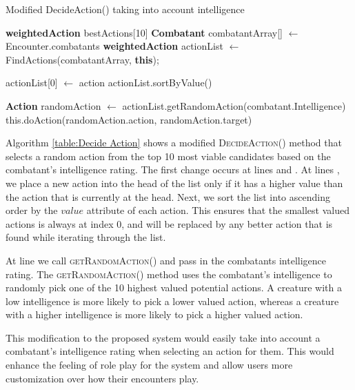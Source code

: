 \documentclass[12pt,a4paper]{report}
\begin{document}
		\begin{algorithm}
			\caption{Modified DecideAction() taking into account intelligence}
			\label{table:Decide Action}
			\begin{algorithmic}[1]
					\State \textbf{weightedAction} bestActions[10]
					\State \textbf{Combatant} combatantArray[] $\gets$ Encounter.combatants
					\State \textbf{weightedAction} actionList $\gets$ FindActions(combatantArray, \textbf{this});
					\State
					
							\State actionList[0] $\gets$ action \label{l:Push}
							\State actionList.sortByValue() \label{l:Sort}
						\EndIf
					\EndFor
					
					
					\State
					\State \textbf{Action} randomAction $\gets$ actionList.getRandomAction(combatant.Intelligence) \label{l:Get}
					\State this.doAction(randomAction.action, randomAction.target)
				\EndFunction
			\end{algorithmic}
		\end{algorithm}
		
		Algorithm \ref{table:Decide Action} shows a modified \textsc{DecideAction()} method that selects a random action from the top 10 most viable candidates based on the combatant's intelligence rating. The first change occurs at lines  and . At lines , we place a new action into the head of the list only if it has a higher value than the action that is currently at the head. Next, we sort the list into ascending order by the $value$ attribute of each action. This ensures that the smallest valued actions is always at index 0, and will be replaced by any better action that is found while iterating through the list. 
		
		At line  we call \textsc{getRandomAction()} and pass in the combatants intelligence rating. The \textsc{getRandomAction()} method uses the combatant's intelligence to randomly pick one of the 10 highest valued potential actions. A creature with a low intelligence is more likely to pick a lower valued action, whereas a creature with a higher intelligence is more likely to pick a higher valued action. 
		
		This modification to the proposed system would easily take into account a combatant's intelligence rating when selecting an action for them. This would enhance the feeling of role play for the system and allow users more customization over how their encounters play. 
		
\end{document}
